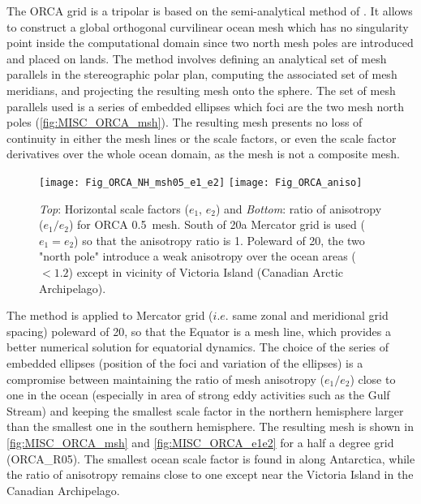 \documentclass[../tex_main/NEMO_manual]{subfiles}
\begin{document}
The ORCA grid is a tripolar is based on the semi-analytical method of \citet{Madec_Imbard_CD96}.
It allows to construct a global orthogonal curvilinear ocean mesh which has no singularity point inside
the computational domain since two north mesh poles are introduced and placed on lands.
The method involves defining an analytical set of mesh parallels in the stereographic polar plan,
computing the associated set of mesh meridians, and projecting the resulting mesh onto the sphere.
The set of mesh parallels used is a series of embedded ellipses which foci are the two mesh north poles
(\autoref{fig:MISC_ORCA_msh}).
The resulting mesh presents no loss of continuity in either the mesh lines or the scale factors,
or even the scale factor derivatives over the whole ocean domain, as the mesh is not a composite mesh. 
\begin{figure}[!tbp]
  \begin{center}
    \texttt{[image: Fig\_ORCA\_NH\_msh05\_e1\_e2]}
    \texttt{[image: Fig\_ORCA\_aniso]}
    \caption {  \protect\label{fig:MISC_ORCA_e1e2}
      \textit{Top}: Horizontal scale factors ($e_1$, $e_2$) and
      \textit{Bottom}: ratio of anisotropy ($e_1 / e_2$)
      for ORCA 0.5\deg ~mesh.
      South of 20\degN a Mercator grid is used ($e_1 = e_2$) so that the anisotropy ratio is 1.
      Poleward of 20\degN, the two "north pole" introduce a weak anisotropy over the ocean areas ($< 1.2$) except in
      vicinity of Victoria Island (Canadian Arctic Archipelago). }
\end{center}   \end{figure}


The method is applied to Mercator grid ($i.e.$ same zonal and meridional grid spacing) poleward of 20\degN,
so that the Equator is a mesh line, which provides a better numerical solution for equatorial dynamics.
The choice of the series of embedded ellipses (position of the foci and variation of the ellipses)
is a compromise between maintaining the ratio of mesh anisotropy ($e_1 / e_2$) close to one in the ocean
(especially in area of strong eddy activities such as the Gulf Stream) and keeping the smallest scale factor in
the northern hemisphere larger than the smallest one in the southern hemisphere.
The resulting mesh is shown in \autoref{fig:MISC_ORCA_msh} and \autoref{fig:MISC_ORCA_e1e2} for
a half a degree grid (ORCA\_R05).
The smallest ocean scale factor is found in along Antarctica,
while the ratio of anisotropy remains close to one except near the Victoria Island in the Canadian Archipelago. 
\end{document}
